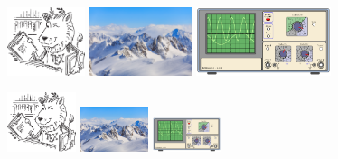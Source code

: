 \documentclass{ctexart}
\begin{document}
    \includegraphics[height=2cm]{lion}
    \includegraphics[height=2cm]{mountain}
    \includegraphics[height=2cm]{oscilloscope}

    \includegraphics[width=2cm]{lion}
    \includegraphics[width=2cm]{mountain}
    \includegraphics[width=2cm]{oscilloscope}
\end{document}
